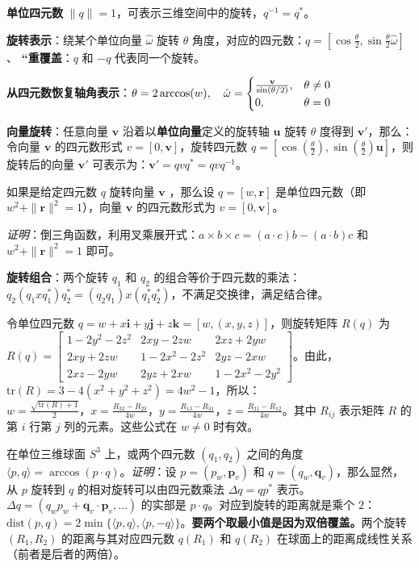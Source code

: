 \documentclass[
  8pt]{extarticle}
\begin{document}
\begin{multicols*}{4}
\textbf{单位四元数}
\(\|q\| = 1\)，可表示三维空间中的旋转，\(q^{-1} = q^*\)。

\textbf{旋转表示}：绕某个单位向量 \(\hat{\omega}\) 旋转 \(\theta\)
角度，对应的四元数：\(q = \left[\cos\frac{\theta}{2}, \sin\frac{\theta}{2} \hat{\omega}\right]\)、
\textbf{``重覆盖}：\(q\) 和 \(-q\) 代表同一个旋转。

\textbf{从四元数恢复轴角表示}：\(\theta = 2 \arccos(w), \quad \hat{\omega} =\begin{cases}\frac{\bold{v}}{\sin(\theta/2)}, & \theta \neq 0 \\0, & \theta = 0\end{cases}\)

\textbf{向量旋转}：任意向量 \(\mathbf{v}\)
沿着以\textbf{单位向量}定义的旋转轴 \(\mathbf{u}\) 旋转 \(\theta\)
度得到 \(\mathbf{v}'\)，那么：令向量 \(\mathbf{v}\) 的四元数形式
\(v = [0, \mathbf{v}]\)，旋转四元数
\(q = \left[\cos\left(\frac{\theta}{2}\right), \sin\left(\frac{\theta}{2}\right)\mathbf{u}\right]\)，则旋转后的向量
\(\mathbf{v}'\) 可表示为：\(\mathbf{v}' = qv q^* = qv q^{-1}\)。

如果是给定四元数 \(q\) 旋转向量 \(\mathbf{v}\) ，那么设
\(q = [w, \mathbf{r}]\) 是单位四元数（即
\(w^2 + \|\mathbf{r}\|^2 = 1\)），向量 \(\mathbf{v}\) 的四元数形式为
\(v = [0, \mathbf{v}]\)。

\emph{证明}：倒三角函数，利用叉乘展开式：\(a \times b \times c = (a \cdot c)b - (a \cdot b)c\)
和 \(w^2 + \|\mathbf{r}\|^2 = 1\) 即可。

\textbf{旋转组合}：两个旋转 \(q_1\) 和 \(q_2\)
的组合等价于四元数的乘法：\(q_2 (q_1 x q_1^*) q_2^* = (q_2 q_1) x (q_1^* q_2^*)\)，不满足交换律，满足结合律。

令单位四元数
\(q = w + x\mathbf{i} + y\mathbf{j} + z\mathbf{k} = [w, (x, y, z)]\)，则旋转矩阵
\(R(q)\) 为
\(R(q) = \begin{bmatrix} 1 - 2y^2 - 2z^2 & 2xy - 2zw & 2xz + 2yw \\ 2xy + 2zw & 1 - 2x^2 - 2z^2 & 2yz - 2xw \\ 2xz - 2yw & 2yz + 2xw & 1 - 2x^2 - 2y^2 \end{bmatrix}\)。由此，\(\text{tr}(R) = 3 - 4(x^2 + y^2 + z^2) = 4w^2 - 1\)，所以：\(w = \frac{\sqrt{\text{tr}(R)+1}}{2}，x = \frac{R_{32}-R_{23}}{4w}，y = \frac{R_{13}-R_{31}}{4w}，z = \frac{R_{21}-R_{12}}{4w}\)。其中
\(R_{ij}\) 表示矩阵 \(R\) 的第 \(i\) 行第 \(j\) 列的元素。这些公式在
\(w \neq 0\) 时有效。

在单位三维球面 \(S^3\) 上，或两个四元数 \((q_1, q_2)\) 之间的角度
\(\langle p, q \rangle = \arccos(p \cdot q)\)。\emph{证明}：设
\(p = (p_w, \mathbf{p}_v)\) 和 \(q = (q_w, \mathbf{q}_v)\)，那么显然，从
\(p\) 旋转到 \(q\) 的相对旋转可以由四元数乘法 \(\Delta q = q p^*\)
表示。\(\Delta q = (q_w p_w + \mathbf{q}_v \cdot \mathbf{p}_v, \dots)\)
的实部是 \(p \cdot q\)。对应到旋转的距离就是乘个
\(2\)：\(\text{dist}(p, q) = 2 \min \{\langle p, q \rangle, \langle p, -q \rangle\}\)。\textbf{要两个取最小值是因为双倍覆盖。}两个旋转
\((R_1, R_2)\) 的距离与其对应四元数 \(q(R_1)\) 和 \(q(R_2)\)
在球面上的距离成线性关系（前者是后者的两倍）。


\end{multicols*}
\end{document}
